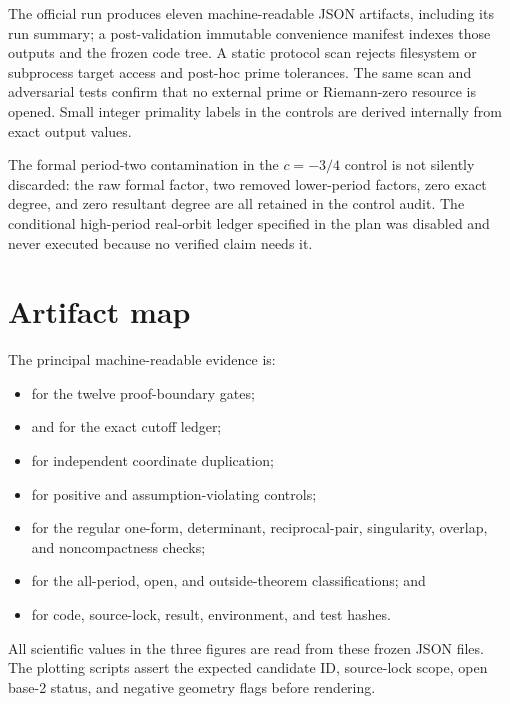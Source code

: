 \documentclass[11pt]{article}
\theoremstyle{remark}
\begin{document}
The official run produces eleven machine-readable JSON artifacts, including
its run summary; a post-validation immutable convenience manifest indexes
those outputs and the frozen code tree.  A static protocol scan rejects
filesystem or subprocess target access and post-hoc prime tolerances.  The
same scan and adversarial tests confirm that no external prime or Riemann-zero
resource is opened.  Small integer primality labels in the controls are
derived internally from exact output values.

The formal period-two contamination in the \(c=-3/4\) control is not silently
discarded: the raw formal factor, two removed lower-period factors, zero exact
degree, and zero resultant degree are all retained in the control audit.  The
conditional high-period real-orbit ledger specified in the plan was disabled
and never executed because no verified claim needs it.

\section{Artifact map}
\label{app:artifact-map}

The principal machine-readable evidence is:
\begin{itemize}
\item \texttt{} for the twelve proof-boundary gates;
\item \texttt{} and
  \texttt{} for the exact cutoff ledger;
\item \texttt{} for independent coordinate duplication;
\item \texttt{} for positive and assumption-violating
  controls;
\item \texttt{} for the regular one-form,
  determinant, reciprocal-pair, singularity, overlap, and noncompactness
  checks;
\item \texttt{} for the all-period, open, and
  outside-theorem classifications; and
\item \texttt{} for code, source-lock, result,
  environment, and test hashes.
\end{itemize}

All scientific values in the three figures are read from these frozen JSON
files.  The plotting scripts assert the expected candidate ID, source-lock
scope, open base-2 status, and negative geometry flags before rendering.



\end{document}
